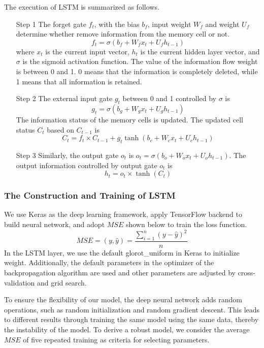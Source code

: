 \documentclass[12pt]{article}
\begin{document}
The execution of LSTM is summarized as follows.
\begin{itemize}
\item[Step 1] The forget gate $f_t$, with the bias $b_f$, input weight $W_f$ and weight $U_f$ determine whether remove information from the memory cell or not.
\begin{equation*}
f_t=\sigma(b_f+W_fx_t+U_fh_{t-1})
\end{equation*} 
where $x_t$ is the current input vector, $h_t$ is the current hidden layer vector, and $\sigma$ is the sigmoid activation function. The value of  the information flow weight is between 0 and 1.  0 means that the information is completely deleted, while 1 means that all information is retained.
\item[Step 2] The external input gate $g_t$ between 0 and 1 controlled by $\sigma$ is
\begin{equation*}
g_t=\sigma(b_g+W_gx_t+U_gh_{t-1})
\end{equation*} 
The information status of the memory cells is updated. The updated cell status $C_t$ based on $C_{t-1}$ is
\begin{equation*}
C_t=f_t\times C_{t-1}+g_t\tanh(b_c+W_cx_t+U_ch_{t-1})
\end{equation*} 
\item[Step 3] Similarly, the output gate $o_t$ is $o_t=\sigma(b_o+W_ox_t+U_oh_{t-1})$. The output information controlled by output gate $o_t$ is
\begin{equation*} 
h_t=o_t \times\tanh(C_t)
\end{equation*}  
\end{itemize} 
\subsubsection{The Construction and Training of LSTM}
We use Keras as the deep learning framework, apply TensorFlow backend to build neural network, and adopt $MSE$ shown below to train the loss function.
\begin{equation*}
MSE=(y, \widehat{y})=\frac{\sum^{n}_{i=1}(y-\widehat{y})^2}{n}
\end{equation*} 
In the LSTM layer, we use the default glorot\_uniform in Keras to initialize weight. Additionally, the default parameters in the optimizer of the backpropagation algorithm are used and other parameters are adjusted by cross-validation and grid search.

To ensure the flexibility of our model, the deep neural network adds random operations, such as random initialization and random gradient descent. This leads to different results through training the same model using the same data, thereby the instability of the model. To derive a robust model, we consider the average $MSE$ of five repeated training as criteria for selecting parameters. 
\end{document}

